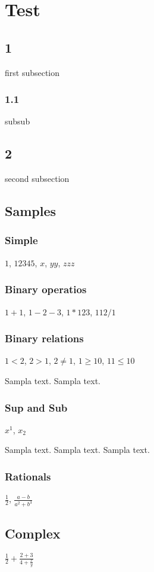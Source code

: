 \section{Test}
\subsection{1}

first subsection

\subsubsection{1.1}

subsub

\subsection{2}

second subsection

\subsection{Samples}

\subsubsection{Simple}

$1$, $12345$, $x$, $yy$, $zzz$

\subsubsection{Binary operatios}

$1 + 1$, $1 - 2 - 3$, $1 * 123$, $112 / 1$

\subsubsection{Binary relations}

$1 < 2$, $2 > 1$, $2 \ne 1$, $1 \ge 10$, $11 \le 10$

Sampla text.
Sampla text.

\subsubsection{Sup and Sub}

$x^1$, $x_2$

Sampla text.
Sampla text.
Sampla text.

\subsubsection{Rationals}

$\frac{1}{2}$, $\frac{a - b}{a^2 + b^3}$

\subsection{Complex}

$\frac{1}{2} + \frac{2 + 3}{4 + \frac{x}{y}}$

